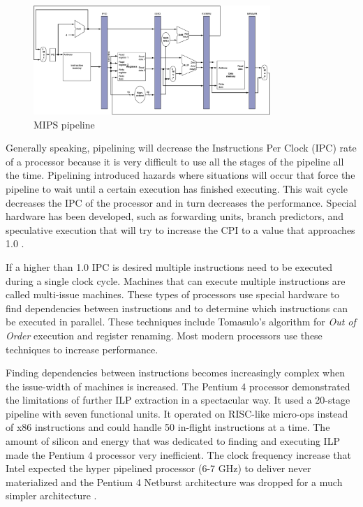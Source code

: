 \begin{figure}[ht]
\centering
\includegraphics[width=0.8\textwidth]{1_introduction/img/MIPS_pipe.png}
\caption{MIPS pipeline \cite{John-L.-Hennessy:2009wq}}
\label{fig:mips_pipe}
\end{figure}

Generally speaking, pipelining will decrease the Instructions Per Clock (IPC) rate of a processor because it is very difficult to use all the stages of the pipeline all the time. Pipelining introduced hazards where situations will occur that force the pipeline to wait until a certain execution has finished executing. This wait cycle decreases the IPC of the processor and in turn decreases the performance. Special hardware has been developed, such as forwarding units, branch predictors, and speculative execution that will try to increase the CPI to a value that approaches 1.0 \cite{John-L.-Hennessy:2009wq}. 

If a higher than 1.0 IPC is desired multiple instructions need to be executed during a single clock cycle. Machines that can execute multiple instructions are called multi-issue machines. These types of processors use special hardware to find dependencies between instructions and to determine which instructions can be executed in parallel. These techniques include Tomasulo's algorithm \cite{5392028} for \emph{Out of Order} execution and register renaming. Most modern processors use these techniques to increase performance.

Finding dependencies between instructions becomes increasingly complex when the issue-width of machines is increased. The Pentium 4 processor \cite{Hinton:2001wd}demonstrated the limitations of further ILP extraction in a spectacular way. It used a 20-stage pipeline \cite{John-L.-Hennessy:2012bs} with seven functional units. It operated on RISC-like micro-ops instead of x86 instructions and could handle 50 in-flight instructions at a time. The amount of silicon and energy that was dedicated to finding and executing ILP made the Pentium 4 processor very inefficient. The clock frequency increase that Intel expected the hyper pipelined processor (6-7 GHz) to deliver never materialized and the Pentium 4 Netburst architecture was dropped for a much simpler architecture \cite{4242287}.

